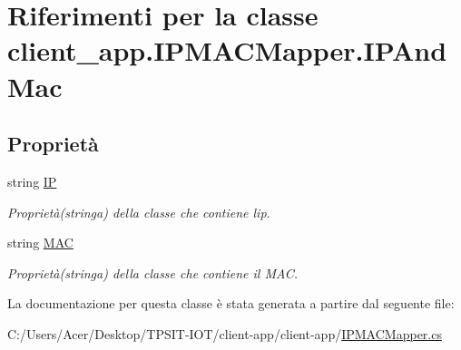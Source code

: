 \hypertarget{classclient__app_1_1_i_p_m_a_c_mapper_1_1_i_p_and_mac}{}\section{Riferimenti per la classe client\+\_\+app.\+I\+P\+M\+A\+C\+Mapper.\+I\+P\+And\+Mac}
\label{classclient__app_1_1_i_p_m_a_c_mapper_1_1_i_p_and_mac}
\subsection*{Proprietà}
\begin{DoxyCompactItemize}
\item 
\mbox{\label{classclient__app_1_1_i_p_m_a_c_mapper_1_1_i_p_and_mac_a1adde9a8f6bc22ede00ce86f409bf61b}} 
string \mbox{\hyperlink{classclient__app_1_1_i_p_m_a_c_mapper_1_1_i_p_and_mac_a1adde9a8f6bc22ede00ce86f409bf61b}{IP}}
\begin{DoxyCompactList}\small\item\em Proprietà(stringa) della classe che contiene l\textquotesingle{}ip. \end{DoxyCompactList}\item 
\mbox{\label{classclient__app_1_1_i_p_m_a_c_mapper_1_1_i_p_and_mac_a805278302cc7fb3f4bb7646ac9bf5d51}} 
string \mbox{\hyperlink{classclient__app_1_1_i_p_m_a_c_mapper_1_1_i_p_and_mac_a805278302cc7fb3f4bb7646ac9bf5d51}{M\+AC}}
\begin{DoxyCompactList}\small\item\em Proprietà(stringa) della classe che contiene il M\+AC. \end{DoxyCompactList}\end{DoxyCompactItemize}


La documentazione per questa classe è stata generata a partire dal seguente file\+:\begin{DoxyCompactItemize}
\item 
C\+:/\+Users/\+Acer/\+Desktop/\+T\+P\+S\+I\+T-\/\+I\+O\+T/client-\/app/client-\/app/\mbox{\hyperlink{_i_p_m_a_c_mapper_8cs}{I\+P\+M\+A\+C\+Mapper.\+cs}}\end{DoxyCompactItemize}
